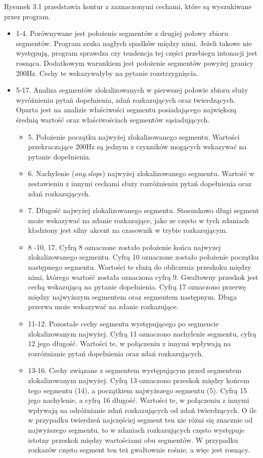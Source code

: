 \documentclass[a4paper,12 pt]{report}
\begin{document}
Rysunek 3.1 przedstawia kontur z zaznaczonymi cechami, które są wyszukiwane przez program.
\begin{itemize}
\item{1-4. Porównywane jest położenie segmentów z drugiej połowy zbioru segmentów. Program szuka nagłych spadków między nimi. Jeżeli takowe nie występują, program sprawdza czy tendencja tej części przebiegu intonacji jest rosnąca. Dodatkowym warunkiem jest położenie segmentów powyżej granicy 200Hz. Cechy te wskazywałyby na pytanie rozstrzygnięcia.}
\item{5-17. Analiza segmentów zlokalizowanych w pierwszej połowie zbioru służy wyróżnieniu pytań dopełnienia, zdań rozkazujących oraz twierdzących. Oparta jest na analizie właściwości segmentu posiadającego największą średnią wartość oraz właściwościach segmentów sąsiadujących.
\begin{itemize}
\item{5. Położenie początku najwyżej zlokalizowanego segmentu. Wartości przekraczające 200Hz są jednym z czynników mogących wskazywać na pytanie dopełnienia.}
\item{6. Nachylenie (\textit{ang.slope}) najwyżej zlokalizowanego segmentu. Wartość w zestawieniu z innymi cechami służy rozróżnieniu pytań dopełnienia oraz zdań rozkazujących.}
\item{7. Długość najwyżej zlokalizowanego segmentu. Stosunkowo długi segment może wskazywać na zdanie rozkazujące, jako ze często w tych zdaniach kładziony jest silny akcent na czasownik w trybie rozkazującym.}
\item{8 -10, 17. Cyfrą 8 oznaczone zostało położenie końca najwyzej zlokalizowanego segmentu. Cyfrą 10 oznaczone zostało położenie początku następnego segmentu. Wartości te służą do obliczenia przeskoku między nimi, którego wartość została oznaczona cyfrą 9. Gwałtowny przeskok jest cechą wskazującą na pytanie dopełnienia. Cyfrą 17 oznaczono przerwę między najwyższym segmentem oraz segmentem następnym. Długa przerwa może wskazywać na zdanie rozkazujące. }
\item{11-12. Pozostałe cechy segmentu występującego po segmencie zlokalizowanym najwyżej. Cyfrą 11 oznaczono nachylenie segmentu, cyfrą 12 jego długość. Wartości te, w połączeniu z innymi wpływają na rozróżnianie pytań dopełnienia oraz zdań rozkazujących.}
\item{13-16. Cechy związane z segmentem występującym przed segmentem zlokalizowanym najwyżej. Cyfrą 13 oznaczono przeskok między końcem tego segmentu (14), a początkiem najwyższego segmentu (5). Cyfrą 15 jego nachylenie, a cyfrą 16 długość. Wartości te, w połączeniu z innymi wpływają na odróżnianie zdań rozkazujących od zdań twierdzących. O ile w przypadku twierdzeń najczęściej segment ten nie różni się znacznie od najwyższego segmentu, to w zdaniach rozkazujących często występuje istotny przeskok między wartościami obu segmentów. W przypadku rozkazów często segment ten też gwałtownie rośnie, a więc jest rosnący. }
\end{itemize}
}
\end{itemize}
\end{document}

